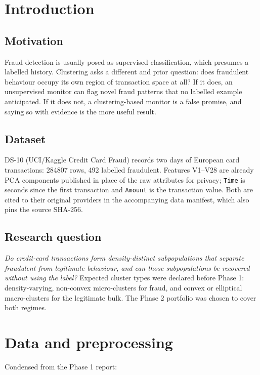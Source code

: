 \documentclass[11pt, a4paper]{article}
\providecommand{\num}[1]{#1}
\begin{document}
\tableofcontents
\newpage

\section{Introduction}

\subsection{Motivation}
Fraud detection is usually posed as supervised classification, which presumes a
labelled history. Clustering asks a different and prior question: does
fraudulent behaviour occupy its own region of transaction space at all? If it
does, an unsupervised monitor can flag novel fraud patterns that no labelled
example anticipated. If it does not, a clustering-based monitor is a false
promise, and saying so with evidence is the more useful result.

\subsection{Dataset}
DS-10 (UCI/Kaggle Credit Card Fraud) records two days of European card
transactions: \num{284807} rows, \num{492} labelled fraudulent. Features V1--V28
are already PCA components published in place of the raw attributes for privacy;
\texttt{Time} is seconds since the first transaction and \texttt{Amount} is the
transaction value. Both are cited to their original providers in the
accompanying data manifest, which also pins the source SHA-256.

\subsection{Research question}
\emph{Do credit-card transactions form density-distinct subpopulations that
separate fraudulent from legitimate behaviour, and can those subpopulations be
recovered without using the label?} Expected cluster types were declared before
Phase 1: density-varying, non-convex micro-clusters for fraud, and convex or
elliptical macro-clusters for the legitimate bulk. The Phase 2 portfolio was
chosen to cover both regimes.

\section{Data and preprocessing}

Condensed from the Phase 1 report:
\end{document}
